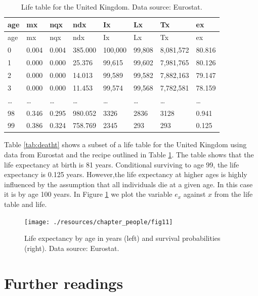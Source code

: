 \documentclass[
]{book}
\begin{document}
\begin{longtable}[]{@{}llllllll@{}}
\caption{\label{tab:deatht2} Life table for the United Kingdom. Data source: Eurostat.}\tabularnewline
\toprule
age & mx & nqx & ndx & Ix & Lx & Tx & ex \\
\midrule
\endfirsthead
\toprule
age & mx & nqx & ndx & Ix & Lx & Tx & ex \\
\midrule
\endhead
0 & 0.004 & 0.004 & 385.000 & 100,000 & 99,808 & 8,081,572 & 80.816 \\
1 & 0.000 & 0.000 & 25.376 & 99,615 & 99,602 & 7,981,765 & 80.126 \\
2 & 0.000 & 0.000 & 14.013 & 99,589 & 99,582 & 7,882,163 & 79.147 \\
3 & 0.000 & 0.000 & 11.453 & 99,574 & 99,568 & 7,782,581 & 78.159 \\
\ldots{} & \ldots{} & \ldots{} & \ldots{} & \ldots{} & \ldots{} & \ldots{} & \ldots{} \\
98 & 0.346 & 0.295 & 980.052 & 3326 & 2836 & 3128 & 0.941 \\
99 & 0.386 & 0.324 & 758.769 & 2345 & 293 & 293 & 0.125 \\
\bottomrule
\end{longtable}

Table \ref{tab:deatht} shows a subset of a life table for the United Kingdom using data from Eurostat and the recipe outlined in Table \ref{tab:deatht2}. The table shows that the life expectancy at birth is 81 years. Conditional surviving to age 99, the life expectancy is 0.125 years. However,the life expectancy at higher ages is highly influenced by the assumption that all individuals die at a given age. In this case it is by age 100 years. In Figure \ref{fig:death2} we plot the variable \(e_x\) against \(x\) from the life table and life.

\begin{figure}

{\centering \texttt{[image: ./resources/chapter\_people/fig11]} 

}

\caption{Life expectancy by age in years (left) and survival probabilities (right). Data source: Eurostat. }\label{fig:death2}
\end{figure}

\hypertarget{further-readings}{%
\section{Further readings}\label{further-readings}}
\end{document}
